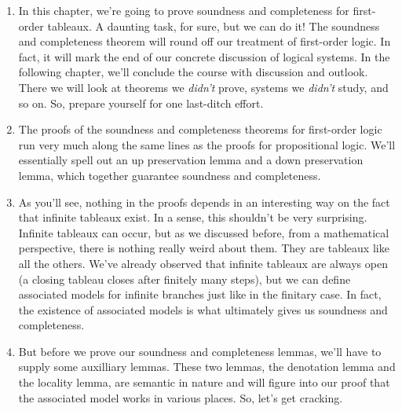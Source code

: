 	\begin{enumerate}[\thesection.1]

		\item In this chapter, we're going to prove soundness
                  and completeness for first-order tableaux. A
                  daunting task, for sure, but we can do it! The
                  soundness and completeness theorem will round off
                  our treatment of first-order logic. In fact, it will
                  mark the end of our concrete discussion of logical
                  systems. In the following chapter, we'll conclude
                  the course with discussion and outlook. There we
                  will look at theorems we \emph{didn't} prove,
                  systems we \emph{didn't} study, and so on. So,
                  prepare yourself for one last-ditch effort.

                 \item The proofs of the soundness and completeness
                   theorems for first-order logic run very much along
                   the same lines as the proofs for propositional
                   logic. We'll essentially spell out an up
                   preservation lemma and a down preservation lemma,
                   which together guarantee soundness and completeness.
                   
                 \item As you'll see, nothing in the proofs depends in
                   an interesting way on the fact that infinite
                   tableaux exist. In a sense, this shouldn't be very
                   surprising. Infinite tableaux can occur, but as we
                   discussed before, from a mathematical perspective,
                   there is nothing really weird about them. They are
                   tableaux like all the others. We've  already
                   observed that infinite tableaux are always
                   open (a closing tableau closes after finitely many
                   steps), but we can define associated models for
                   infinite branches just like in the finitary
                   case. In fact, the existence of associated models
                   is what ultimately gives us soundness and
                   completeness.

                   \item But before we prove our soundness and
                     completeness lemmas, we'll have to supply some
                     auxilliary lemmas. These two lemmas, the
                     denotation lemma and the locality lemma, are
                     semantic in nature and will figure into our proof
                     that the associated model works in various
                     places. So, let's get cracking.

		
	\end{enumerate}
	
